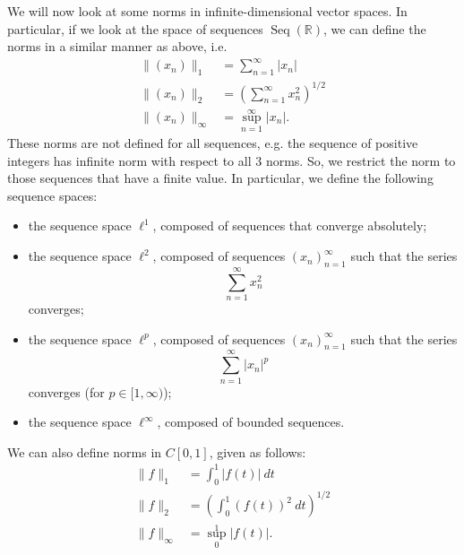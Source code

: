 \documentclass[a4paper, openany]{memoir}
\theoremstyle{definition}
\theoremstyle{plain}
\begin{document}
    We will now look at some norms in infinite-dimensional vector spaces. In particular, if we look at the space of sequences $\operatorname{Seq}(\mathbb{R})$, we can define the norms in a similar manner as above, i.e.
    \begin{align*}
        \lVert (x_n) \rVert_1 &= \sum_{n=1}^\infty |x_n| \\
        \lVert (x_n) \rVert_2 &= \left(\sum_{n=1}^\infty x_n^2\right)^{1/2} \\
        \lVert (x_n) \rVert_\infty &= \sup_{n=1}^\infty |x_n|.
    \end{align*}
    These norms are not defined for all sequences, e.g. the sequence of positive integers has infinite norm with respect to all 3 norms. So, we restrict the norm to those sequences that have a finite value. In particular, we define the following sequence spaces:
    \begin{itemize}
        \item the sequence space $\ell^1$, composed of sequences that converge absolutely;
        \item the sequence space $\ell^2$, composed of sequences $(x_n)_{n=1}^\infty$ such that the series
        \[\sum_{n=1}^\infty x_n^2\]
        converges;
        \item the sequence space $\ell^p$, composed of sequences $(x_n)_{n=1}^\infty$ such that the series
        \[\sum_{n=1}^\infty |x_n|^p\]
        converges (for $p \in [1, \infty)$);
        \item the sequence space $\ell^\infty$, composed of bounded sequences.
    \end{itemize}

    We can also define norms in $C[0, 1]$, given as follows:
    \begin{align*}
        \lVert f \rVert_1 &= \int_0^1 |f(t)| \ dt \\
        \lVert f \rVert_2 &= \left(\int_0^1 (f(t))^2 \ dt\right)^{1/2} \\
        \lVert f \rVert_\infty &= \sup_0^1 |f(t)|.
    \end{align*}
    
\end{document}
